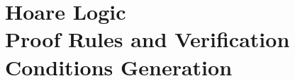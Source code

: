 \documentclass[aspectratio=169]{beamer}
\begin{document}
\section*{Hoare Logic\\\small{Proof Rules and Verification Conditions Generation}}

\end{document}
